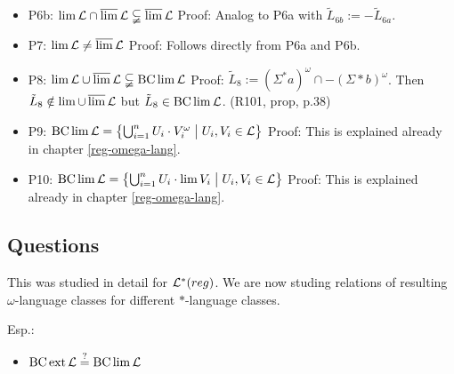 \begin{itemize}
\item P6b: $\lim \mathcal{L} \cap \operatorname{\overline{lim}} \mathcal{L} \subsetneqq \operatorname{\overline{lim}} \mathcal{L}$ \newline
Proof: Analog to P6a with $\tilde{L}_{6b} := -\tilde{L}_{6a}$.
\item P7: $\lim \mathcal{L} \neq \operatorname{\overline{lim}} \mathcal{L}$ \newline
Proof: Follows directly from P6a and P6b.
\item P8: $\lim \mathcal{L} \cup \operatorname{\overline{lim}} \mathcal{L} \subsetneqq \operatorname{BC} \lim \mathcal{L}$ \newline
Proof: $\tilde{L}_8 := (\Sigma^*a)^\omega \cap -(\Sigma*b)^\omega$. Then $\tilde{L}_8 \notin \lim \cup \operatorname{\overline{lim}} \mathcal{L}$ but $\tilde{L}_8 \in \operatorname{BC} \lim \mathcal{L}$. (R101, prop, p.38)
\item P9: $\BC \lim \Lang = \Set{ \bigcup_{i=1}^n U_i \cdot V_i^\omega}{U_i, V_i \in \Lang}$ \newline
Proof: This is explained already in chapter \ref{reg-omega-lang}. 
\item P10: $\BC \lim \Lang = \Set{\bigcup_{i=1}^n U_i \cdot \lim V_i}{U_i, V_i \in \Lang}$ \newline
Proof: This is explained already in chapter \ref{reg-omega-lang}. 
\end{itemize}

\subsection{Questions}

This was studied in detail for $\mathcal{L}^*(reg)$. We are now studing relations of resulting $\omega$-language classes for different $*$-language classes.

Esp.:
\begin{itemize}
\item $\operatorname{BC} \operatorname{ext} \mathcal{L} \overset{?}{=} \operatorname{BC} \lim \mathcal{L}$
\end{itemize}

